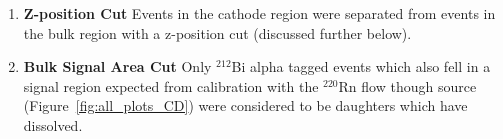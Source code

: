 \begin{enumerate}
\item \textbf{Z-position Cut} Events in the cathode region were separated from events in the bulk region with a z-position cut (discussed further below).
\item \textbf{Bulk Signal Area Cut} Only $^{212}$Bi alpha tagged events which also fell in a signal region expected from calibration with the $^{220}$Rn flow though source (Figure~\ref{fig:all_plots_CD}) were considered to be daughters which have dissolved.
\end{enumerate}



